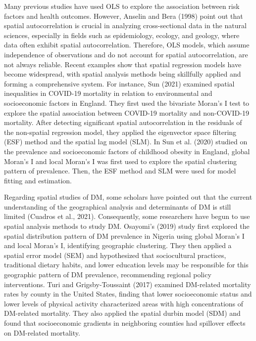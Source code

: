 Many previous studies have used OLS to explore the association between risk factors and health outcomes. However, Anselin and Bera (1998) point out that spatial autocorrelation is crucial in analyzing cross-sectional data in the natural sciences, especially in fields such as epidemiology, ecology, and geology, where data often exhibit spatial autocorrelation. Therefore, OLS models, which assume independence of observations and do not account for spatial autocorrelation, are not always reliable. Recent examples show that spatial regression models have become widespread, with spatial analysis methods being skillfully applied and forming a comprehensive system. For instance, Sun (2021) examined spatial inequalities in COVID-19 mortality in relation to environmental and socioeconomic factors in England. They first used the bivariate Moran's I test to explore the spatial association between COVID-19 mortality and non-COVID-19 mortality. After detecting significant spatial autocorrelation in the residuals of the non-spatial regression model, they applied the eigenvector space filtering (ESF) method and the spatial lag model (SLM). In Sun et al. (2020) studied on the prevalence and socioeconomic factors of childhood obesity in England, global Moran's I and local Moran's I was first used to explore the spatial clustering pattern of prevalence. Then, the ESF method and SLM were used for model fitting and estimation.

Regarding spatial studies of DM, some scholars have pointed out that the current understanding of the geographical analysis and determinants of DM is still limited (Cuadros et al., 2021). Consequently, some researchers have begun to use spatial analysis methods to study DM. Osayomi's (2019) study first explored the spatial distribution pattern of DM prevalence in Nigeria using global Moran's I and local Moran's I, identifying geographic clustering. They then applied a spatial error model (SEM) and hypothesized that sociocultural practices, traditional dietary habits, and lower education levels may be responsible for this geographic pattern of DM prevalence, recommending regional policy interventions. Turi and Grigsby-Toussaint (2017) examined DM-related mortality rates by county in the United States, finding that lower socioeconomic status and lower levels of physical activity characterized areas with high concentrations of DM-related mortality. They also applied the spatial durbin model (SDM) and found that socioeconomic gradients in neighboring counties had spillover effects on DM-related mortality.

